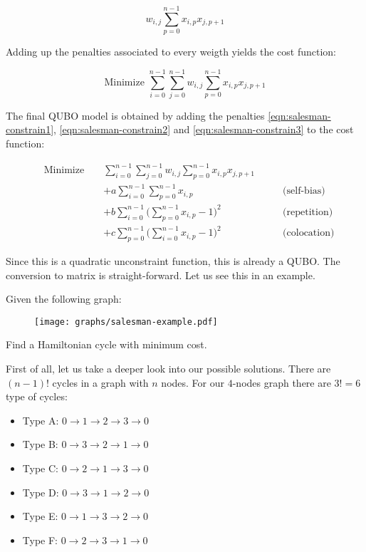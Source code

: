 $$ w_{i,j} \sum_{p=0}^{n-1} x_{i,p}x_{j,p+1} $$

Adding up the penalties associated to every weigth yields the cost function:

$$ \text{Minimize } \sum_{i=0}^{n-1} \sum_{j=0}^{n-1} w_{i,j}\sum_{p=0}^{n-1} x_{i,p}x_{j,p+1} $$

The final QUBO model is obtained by adding the penalties \ref{eqn:salesman-constrain1}, \ref{eqn:salesman-constrain2} and \ref{eqn:salesman-constrain3} to the cost function:

\begin{equation}
	\begin{alignedat}{3}
		& \text{Minimize }	&& \sum_{i=0}^{n-1} \sum_{j=0}^{n-1} w_{i,j}\sum_{p=0}^{n-1} x_{i,p}x_{j,p+1} & \\
		& && + a \sum_{i=0}^{n-1} \sum_{p=0}^{n-1} x_{i,p} & \qquad \text{(self-bias)} \\
		& && + b \sum_{i=0}^{n-1} \Big( \sum_{p=0}^{n-1} x_{i,p} - 1 \Big)^2 & \qquad \text{(repetition)} \\
		& && + c \sum_{p=0}^{n-1} \Big( \sum_{i=0}^{n-1} x_{i,p} - 1 \Big)^2 & \qquad \text{(colocation)}
	\end{alignedat}
	\label{eqn:salesman-cost-funct}
\end{equation}


Since this is a quadratic unconstraint function, this is already a QUBO. The conversion to matrix is straight-forward. Let us see this in an example.




Given the following graph:

\begin{figure}[H]
	\texttt{[image: graphs/salesman-example.pdf]}
	\centering
\end{figure}

Find a Hamiltonian cycle with minimum cost. 

First of all, let us take a deeper look into our possible solutions. There are $(n-1)!$ cycles in a graph with $n$ nodes. For our $4$-nodes graph there are $3! = 6$ type of cycles:

\begin{itemize}
	\item Type A: $0 \rightarrow 1 \rightarrow 2 \rightarrow 3 \rightarrow 0$
	\item Type B: $0 \rightarrow 3 \rightarrow 2 \rightarrow 1 \rightarrow 0$
	\item Type C: $0 \rightarrow 2 \rightarrow 1 \rightarrow 3 \rightarrow 0$
	\item Type D: $0 \rightarrow 3 \rightarrow 1 \rightarrow 2 \rightarrow 0$
	\item Type E: $0 \rightarrow 1 \rightarrow 3 \rightarrow 2 \rightarrow 0$
	\item Type F: $0 \rightarrow 2 \rightarrow 3 \rightarrow 1 \rightarrow 0$
\end{itemize}

